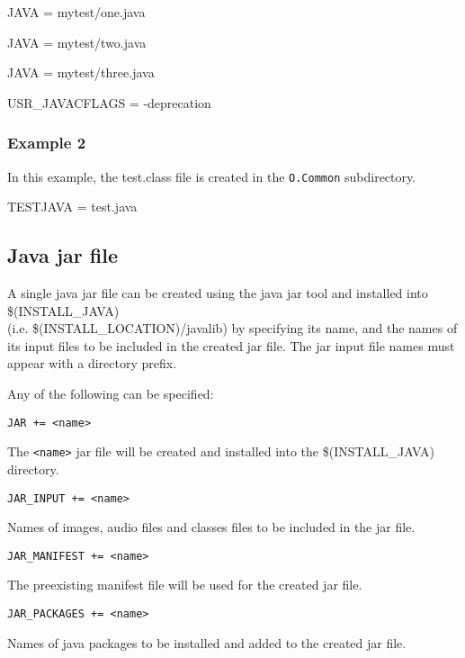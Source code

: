 \begin{description}

\item {}JAVA = mytest/one.java

\item JAVA = mytest/two.java

\item JAVA = mytest/three.java

\item {}USR\_JAVACFLAGS = -deprecation

\end{description}

\subsubsection{Example 2}

In this example, the test.class file is created in the \verb|O.Common| subdirectory.

\begin{description}

\item {}TESTJAVA = test.java

\end{description}

\subsection{Java jar file}

A single java jar file can be created using the java jar tool and installed into \$(INSTALL\_JAVA) \\
(i.e. \$(INSTALL\_LOCATION)/javalib) by specifying its name, and the names of its input files to be included in the created jar 
file. The jar input file names must appear with a directory prefix.

Any of the following can be specified:

\begin{description}

\item {}\verb|JAR += <name>|

The \verb|<name>| jar file will be created and installed into the \$(INSTALL\_JAVA) directory.

\item {}\verb|JAR_INPUT += <name>|

Names of images, audio files and classes files to be included in the jar file.

\item {}\verb|JAR_MANIFEST += <name>|

The preexisting manifest file will be used for the created jar file.

\item \verb|JAR_PACKAGES += <name>|

Names of java packages to be installed and added to the created jar file.

\end{description}

